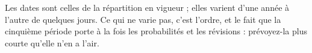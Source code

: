 \vspace{0.6em}

\begin{center}
\small
{}\qquad
{}\qquad
{}\qquad
{}
\end{center}

\vspace{1em}

\noindent Les dates sont celles de la répartition en vigueur ; elles varient
d'une année à l'autre de quelques jours. Ce qui ne varie pas, c'est l'ordre,
et le fait que la cinquième période porte à la fois les probabilités et les
révisions : prévoyez-la plus courte qu'elle n'en a l'air.
